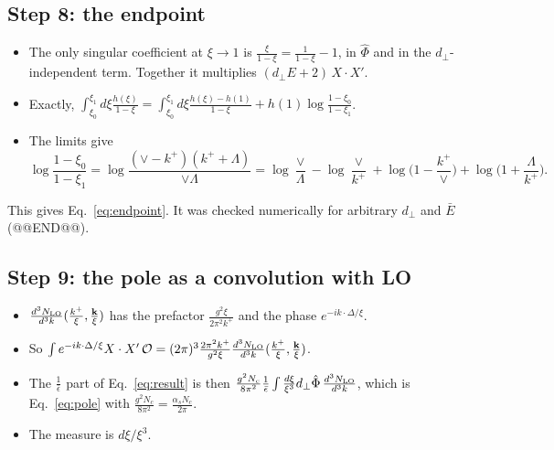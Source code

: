 \documentclass[10pt]{article}
\numberwithin{equation}{section}
\newcommand{\OO}{\mathcal O}
\begin{document}
\subsection{Step 8: the endpoint}
\begin{itemize}
\item The only singular coefficient at $\xi\to1$ is $\frac{\xi}{1-\xi}=\frac{1}{1-\xi}-1$, in $\hat\Phi$ and in the $d_\perp$-independent term. Together it multiplies $(d_\perp E+2)\,X\cdot X'$.
\item Exactly, $\int_{\xi_0}^{\xi_1}d\xi\frac{h(\xi)}{1-\xi}=\int_{\xi_0}^{\xi_1}d\xi\frac{h(\xi)-h(1)}{1-\xi}+h(1)\log\frac{1-\xi_0}{1-\xi_1}$.
\item The limits give
\begin{equation}
\log\frac{1-\xi_0}{1-\xi_1}=\log\frac{(\vee-k^+)(k^++\Lambda)}{\vee\Lambda}=\log\frac{\vee}{\Lambda}-\log\frac{\vee}{k^+}+\log\Big(1-\frac{k^+}{\vee}\Big)+\log\Big(1+\frac{\Lambda}{k^+}\Big).
\end{equation}
\end{itemize}
This gives Eq.~\eqref{eq:endpoint}. It was checked numerically for arbitrary $d_\perp$ and $\bar E$ (@@END@@).

\subsection{Step 9: the pole as a convolution with LO}
\begin{itemize}
\item $\frac{d^3N_{\rm LO}}{d^3k}(\frac{k^+}{\xi},\frac{\mathbf k}{\xi})$ has the prefactor $\frac{g^2\xi}{2\pi^2k^+}$ and the phase $e^{-ik\cdot\Delta/\xi}$.
\item So $\int e^{-ik\cdot\Delta/\xi}X\cdot X'\,\OO=(2\pi)^3\frac{2\pi^2k^+}{g^2\xi}\frac{d^3N_{\rm LO}}{d^3k}(\frac{k^+}{\xi},\frac{\mathbf k}{\xi})$.
\item The $\frac1{\bar\epsilon}$ part of Eq.~\eqref{eq:result} is then $\frac{g^2N_c}{8\pi^2}\frac{1}{\bar\epsilon}\int\frac{d\xi}{\xi^3}d_\perp\hat\Phi\,\frac{d^3N_{\rm LO}}{d^3k}$, which is Eq.~\eqref{eq:pole} with $\frac{g^2N_c}{8\pi^2}=\frac{\alpha_sN_c}{2\pi}$.
\item The measure is $d\xi/\xi^3$.
\end{itemize}

\end{document}
